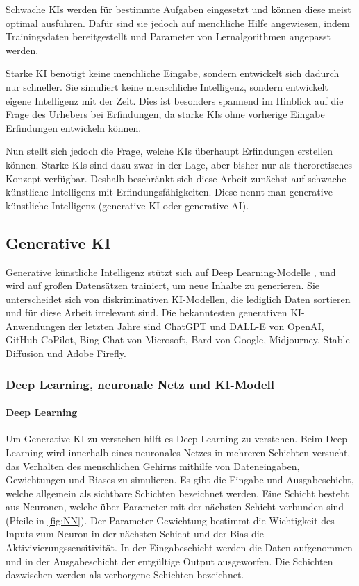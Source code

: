 Schwache KIs werden für bestimmte Aufgaben eingesetzt und 
können diese meist optimal ausführen. 
Dafür sind sie jedoch auf menchliche Hilfe angewiesen, 
indem Trainingsdaten bereitgestellt und 
Parameter von Lernalgorithmen angepasst werden.

Starke KI benötigt keine menchliche Eingabe, 
sondern entwickelt sich dadurch nur schneller. 
Sie simuliert keine menschliche Intelligenz, 
sondern entwickelt eigene Intelligenz mit der Zeit. 
Dies ist besonders spannend im Hinblick auf die Frage 
des Urhebers bei Erfindungen, 
da starke KIs ohne vorherige Eingabe Erfindungen entwickeln können.
\cite{WasIstStarke2023}

Nun stellt sich jedoch die Frage,
welche KIs überhaupt 
Erfindungen erstellen können. Starke KIs sind dazu zwar in 
der Lage, aber bisher nur als theroretisches Konzept verfügbar. 
Deshalb beschränkt sich diese Arbeit zunächst auf schwache künstliche Intelligenz
mit Erfindungsfähigkeiten. Diese nennt man generative künstliche Intelligenz 
(generative KI oder generative AI).

\subsection{Generative KI}
Generative künstliche Intelligenz 
stützt sich auf Deep Learning-Modelle , 
und wird auf großen Datensätzen trainiert, um neue Inhalte zu generieren.  
Sie unterscheidet sich von diskriminativen KI-Modellen, 
die lediglich Daten sortieren und für diese Arbeit irrelevant sind. 
Die bekanntesten generativen KI-Anwendungen der letzten Jahre sind
ChatGPT und DALL-E von OpenAI, GitHub CoPilot, Bing Chat von Microsoft, 
Bard von Google, Midjourney, Stable Diffusion und Adobe Firefly. \cite{WasIstGenerative}

\subsubsection{Deep Learning, neuronale Netz und KI-Modell}

\paragraph{Deep Learning}
Um Generative KI zu verstehen hilft es Deep Learning zu verstehen.
Beim Deep Learning wird innerhalb eines neuronales Netzes in
mehreren Schichten versucht, 
das Verhalten des menschlichen Gehirns mithilfe von Dateneingaben, 
Gewichtungen und Biases zu simulieren. 
Es gibt die Eingabe und Ausgabeschicht, 
welche allgemein als sichtbare Schichten bezeichnet werden.
Eine Schicht besteht aus Neuronen, welche über Parameter 
mit der nächsten Schicht verbunden sind (Pfeile in \ref{fig:NN}).
Der Parameter Gewichtung bestimmt die Wichtigkeit des Inputs 
zum Neuron in der nächsten Schicht und der Bias die Aktivivierungssensitivität.
In der Eingabeschicht werden die Daten aufgenommen und 
in der Ausgabeschicht der entgültige Output ausgeworfen.
Die Schichten dazwischen werden als verborgene Schichten bezeichnet.
\cite{WasIstDeep2023}
\cite{KuenstlicheIntelligenz}
\\
\\
